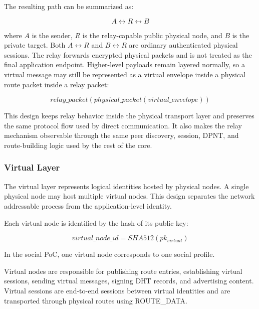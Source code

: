 \documentclass[12pt]{article}
\newcommand{\codebreak}[1]{{\footnotesize\ttfamily #1}}
\begin{document}
The resulting path can be summarized as:

\begin{equation}
    A \leftrightarrow R \leftrightarrow B
\end{equation}

where \(A\) is the sender, \(R\) is the relay-capable public physical node, and \(B\) is the private target. Both \(A \leftrightarrow R\) and \(B \leftrightarrow R\) are ordinary authenticated physical sessions. The relay forwards encrypted physical packets and is not treated as the final application endpoint. Higher-level payloads remain layered normally, so a virtual message may still be represented as a virtual envelope inside a physical route packet inside a relay packet:

\begin{equation}
    relay\_packet(physical\_packet(virtual\_envelope))
\end{equation}

This design keeps relay behavior inside the physical transport layer and preserves the same protocol flow used by direct communication. It also makes the relay mechanism observable through the same peer discovery, session, DPNT, and route-building logic used by the rest of the core.

\subsubsection{Virtual Layer}
\label{subsec:virtual-layer-implementation}

The virtual layer represents logical identities hosted by physical nodes. A single physical node may host multiple virtual nodes. This design separates the network addressable process from the application-level identity.

Each virtual node is identified by the hash of its public key:

\begin{equation}
    virtual\_node\_id = SHA512(pk_{virtual})
\end{equation}

In the social PoC, one virtual node corresponds to one social profile.

Virtual nodes are responsible for publishing route entries, establishing virtual sessions, sending virtual messages, signing DHT records, and advertising content. Virtual sessions are end-to-end sessions between virtual identities and are transported through physical routes using \codebreak{ROUTE\_\allowbreak{}DATA}.
\end{document}
